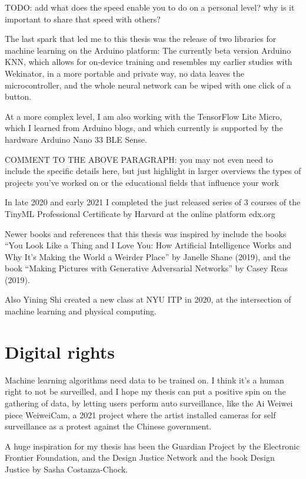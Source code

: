 TODO: add what does the speed enable you to do on a personal level? why is it important to share that speed with others?

The last spark that led me to this thesis was the release of two libraries for machine learning on the Arduino platform: The currently beta version Arduino KNN, which allows for on-device training and resembles my earlier studies with Wekinator, in a more portable and private way, no data leaves the microcontroller, and the whole neural network can be wiped with one click of a button.

At a more complex level, I am also working with the TensorFlow Lite Micro, which I learned from Arduino blogs, and which currently is supported by the hardware Arduino Nano 33 BLE Sense.

COMMENT TO THE ABOVE PARAGRAPH: you may not even need to include the specific details here, but just highlight in larger overviews the types of projects you've worked on or the educational fields that influence your work

In late 2020 and early 2021 I completed the just released series of 3 courses of the TinyML Professional Certificate by Harvard at the online platform edx.org

Newer books and references that this thesis was inspired by include the books “You Look Like a Thing and I Love You: How Artificial Intelligence Works and Why It's Making the World a Weirder Place” by Janelle Shane (2019), and the book “Making Pictures with Generative Adversarial Networks” by Casey Reas (2019).

Also Yining Shi created a new class at NYU ITP in 2020, at the intersection of machine learning and physical computing.

\section{Digital rights}

Machine learning algorithms need data to be trained on. I think it’s a human right to not be surveilled, and I hope my thesis can put a positive spin on the gathering of data, by letting users perform auto surveillance, like the Ai Weiwei piece WeiweiCam, a 2021 project where the artist installed cameras for self surveillance as a protest against the Chinese government.

A huge inspiration for my thesis has been the Guardian Project by the Electronic Frontier Foundation, and the Design Justice Network and the book Design Justice by Sasha Costanza-Chock.

